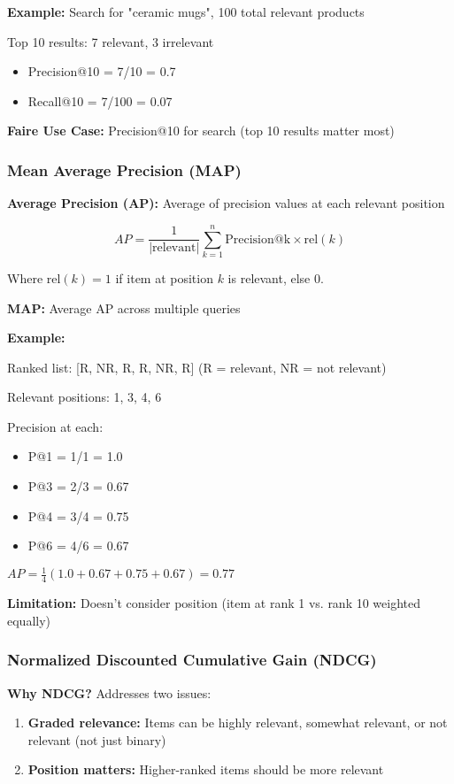 \documentclass[11pt,letterpaper]{article}
\begin{document}
\textbf{Example:} Search for "ceramic mugs", 100 total relevant products

Top 10 results: 7 relevant, 3 irrelevant
\begin{itemize}
    \item Precision@10 = 7/10 = 0.7
    \item Recall@10 = 7/100 = 0.07
\end{itemize}

\textbf{Faire Use Case:} Precision@10 for search (top 10 results matter most)

\subsubsection{Mean Average Precision (MAP)}

\textbf{Average Precision (AP):} Average of precision values at each relevant position

\begin{equation}
AP = \frac{1}{|\text{relevant}|} \sum_{k=1}^{n} \text{Precision@k} \times \text{rel}(k)
\end{equation}

Where $\text{rel}(k) = 1$ if item at position $k$ is relevant, else 0.

\textbf{MAP:} Average AP across multiple queries

\textbf{Example:}

Ranked list: [R, NR, R, R, NR, R] (R = relevant, NR = not relevant)

Relevant positions: 1, 3, 4, 6

Precision at each:
\begin{itemize}
    \item P@1 = 1/1 = 1.0
    \item P@3 = 2/3 = 0.67
    \item P@4 = 3/4 = 0.75
    \item P@6 = 4/6 = 0.67
\end{itemize}

$AP = \frac{1}{4}(1.0 + 0.67 + 0.75 + 0.67) = 0.77$

\textbf{Limitation:} Doesn't consider position (item at rank 1 vs. rank 10 weighted equally)

\subsubsection{Normalized Discounted Cumulative Gain (NDCG)}

\textbf{Why NDCG?} Addresses two issues:
\begin{enumerate}
    \item \textbf{Graded relevance:} Items can be highly relevant, somewhat relevant, or not relevant (not just binary)
    \item \textbf{Position matters:} Higher-ranked items should be more relevant
\end{enumerate}
\end{document}
